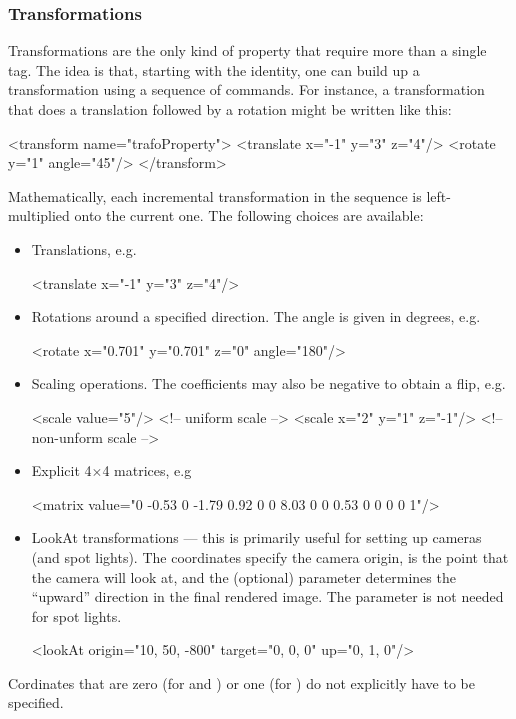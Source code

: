 \subsubsection{Transformations}
Transformations are the only kind of property that require more than a single tag. The idea is that, starting
with the identity, one can build up a transformation using a sequence of commands. For instance, a transformation that 
does a translation followed by a rotation might be written like this:
\begin{xml}
<transform name="trafoProperty">
	<translate x="-1" y="3" z="4"/>
	<rotate y="1" angle="45"/>
</transform>
\end{xml}
Mathematically, each incremental transformation in the sequence is left-multiplied onto the current one. The following
choices are available:
\begin{itemize}
\item Translations, e.g.
\begin{xml}
<translate x="-1" y="3" z="4"/>
\end{xml}
\item Rotations around a specified direction. The angle is given in degrees, e.g.
\begin{xml}
<rotate x="0.701" y="0.701" z="0" angle="180"/>
\end{xml}
\item Scaling operations. The coefficients may also be negative to obtain a flip, e.g.
\begin{xml}
<scale value="5"/>           <!-- uniform scale -->
<scale x="2" y="1" z="-1"/>  <!-- non-unform scale -->
\end{xml}
\item Explicit 4$\times$4 matrices, e.g
\begin{xml}
<matrix value="0 -0.53 0 -1.79 0.92 0 0 8.03 0 0 0.53 0 0 0 0 1"/>
\end{xml}
\item LookAt transformations --- this is primarily useful for setting up cameras (and spot lights). The  coordinates
specify the camera origin,  is the point that the camera will look at, and the 
(optional)  parameter determines the ``upward'' direction in the final rendered image.
The  parameter is not needed for spot lights.
\begin{xml}
<lookAt origin="10, 50, -800" target="0, 0, 0" up="0, 1, 0"/>
\end{xml}
\end{itemize}
Cordinates that are zero (for  and ) or one (for )
do not explicitly have to be specified.
